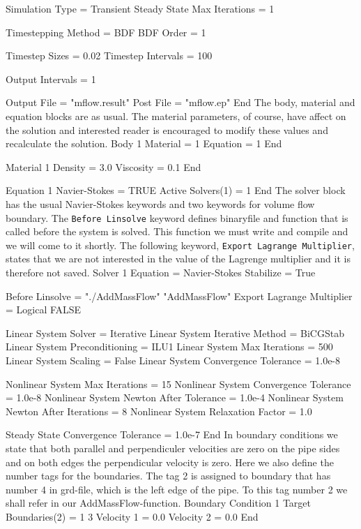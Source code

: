   Simulation Type = Transient
  Steady State Max Iterations = 1

  Timestepping Method = BDF
  BDF Order = 1

  Timestep Sizes = 0.02
  Timestep Intervals = 100

  Output Intervals = 1

  Output File = "mflow.result"
  Post File = "mflow.ep"
End
\ttend
The body, material and equation blocks are as usual. The material parameters,
of course, have affect on the solution and interested reader is encouraged to
modify these values and recalculate the solution.
\ttbegin
Body 1
  Material = 1
  Equation = 1
End

Material 1
  Density = 3.0
  Viscosity = 0.1
End

Equation 1
  Navier-Stokes = TRUE
  Active Solvers(1) = 1
End
\ttend
The solver block has the usual Navier-Stokes keywords and two keywords
for volume flow boundary. 
The {\tt Before Linsolve} keyword defines binaryfile and function that is
called before the system is solved. This function we must write and
compile and we will come to it shortly. The following keyword,
{\tt Export Lagrange Multiplier}, states that we are not interested in 
the value of the Lagrenge multiplier and it is therefore not saved.
\ttbegin
Solver 1
  Equation = Navier-Stokes
  Stabilize = True

  Before Linsolve = "./AddMassFlow" "AddMassFlow"
  Export Lagrange Multiplier = Logical FALSE

  Linear System Solver = Iterative
  Linear System Iterative Method = BiCGStab
  Linear System Preconditioning = ILU1
  Linear System Max Iterations = 500
  Linear System Scaling = False
  Linear System Convergence Tolerance = 1.0e-8

  Nonlinear System Max Iterations = 15
  Nonlinear System Convergence Tolerance = 1.0e-8
  Nonlinear System Newton After Tolerance = 1.0e-4
  Nonlinear System Newton After Iterations = 8
  Nonlinear System Relaxation Factor = 1.0

  Steady State Convergence Tolerance = 1.0e-7
End
\ttend
In boundary conditions we state that both parallel and perpendiculer velocities
are zero on the pipe sides and on both edges the perpendicular velocity is zero.
Here we also define the number tags for the boundaries. The tag 2 is assigned to
boundary that has number 4 in grd-file, which is the left edge of the pipe.
To this tag number 2 we shall refer in our AddMassFlow-function.
\ttbegin
Boundary Condition 1
  Target Boundaries(2) = 1 3
  Velocity 1 = 0.0
  Velocity 2 = 0.0
End

